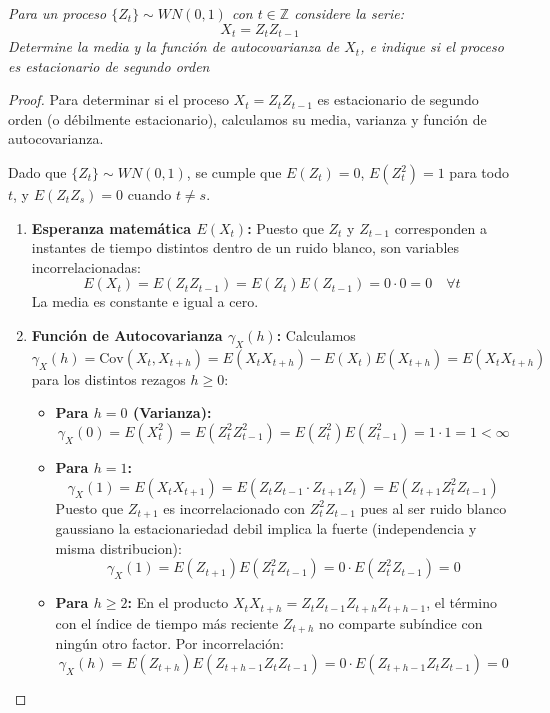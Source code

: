\documentclass[11pt,letterpaper]{article}
\newcommand{\Z}{\mathbb{Z}}
\begin{document}
\begin{tcolorbox}[
	title = \textcolor{black}{\textcolor{white}{Problema 9}},]
\textit{Para un proceso $\{Z_t\}\sim WN(0,1)$ con $t\in \Z$ considere la serie:\,\\
\begin{equation*}
    X_t=Z_{t}Z_{t-1}
\end{equation*}
Determine la media y la funci\'on de autocovarianza de $X_t$, e indique si el proceso es estacionario de segundo orden}
\end{tcolorbox}
\begin{proof}
Para determinar si el proceso $X_t = Z_t Z_{t-1}$ es estacionario de segundo orden (o débilmente estacionario), calculamos su media, varianza y función de autocovarianza. 

Dado que $\{Z_t\} \sim WN(0, 1)$, se cumple que $E(Z_t) = 0$, $E(Z_t^2) = 1$ para todo $t$, y $E(Z_t Z_s) = 0$ cuando $t \neq s$.

\begin{enumerate}
    \item \textbf{Esperanza matemática $E(X_t)$:}
    Puesto que $Z_t$ y $Z_{t-1}$ corresponden a instantes de tiempo distintos dentro de un ruido blanco, son variables incorrelacionadas:
    \[
    E(X_t) = E(Z_t Z_{t-1}) = E(Z_t) E(Z_{t-1}) = 0 \cdot 0 = 0 \quad \forall t
    \]
    La media es constante e igual a cero.

    \item \textbf{Función de Autocovarianza $\gamma_X(h)$:}
    Calculamos $\gamma_X(h) = \text{Cov}(X_t, X_{t+h}) = E(X_t X_{t+h}) - E(X_t)E(X_{t+h}) = E(X_t X_{t+h})$ para los distintos rezagos $h \ge 0$:

    \begin{itemize}
        \item \textbf{Para $h = 0$ (Varianza):}
        \[
        \gamma_X(0) = E(X_t^2) = E(Z_t^2 Z_{t-1}^2) = E(Z_t^2) E(Z_{t-1}^2) = 1 \cdot 1 = 1 < \infty
        \]

        \item \textbf{Para $h = 1$:}
        \[
        \gamma_X(1) = E(X_t X_{t+1}) = E(Z_t Z_{t-1} \cdot Z_{t+1} Z_t) = E(Z_{t+1} Z_t^2 Z_{t-1})
        \]
        Puesto que $Z_{t+1}$ es incorrelacionado con $Z_t^2 Z_{t-1}$ pues al ser ruido blanco gaussiano la estacionariedad debil implica la fuerte (independencia y misma distribucion):
        \[
        \gamma_X(1) = E(Z_{t+1}) E(Z_t^2 Z_{t-1}) = 0 \cdot E(Z_t^2 Z_{t-1}) = 0
        \]

        \item \textbf{Para $h \ge 2$:}
        En el producto $X_t X_{t+h} = Z_t Z_{t-1} Z_{t+h} Z_{t+h-1}$, el término con el índice de tiempo más reciente $Z_{t+h}$ no comparte subíndice con ningún otro factor. Por incorrelación:
        \[
        \gamma_X(h) = E(Z_{t+h}) E(Z_{t+h-1} Z_t Z_{t-1}) = 0 \cdot E(Z_{t+h-1} Z_t Z_{t-1}) = 0
        \]
    \end{itemize}


\end{enumerate}
\end{proof}
\end{document}
